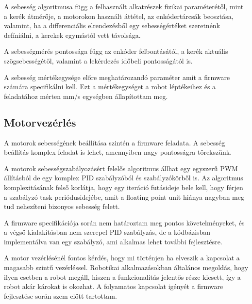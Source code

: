 A sebesség algoritmusa függ a felhasznált alkatrészek fizikai paraméterétől, mint
a kerék átmérője, a motorokon használt áttétel, az enkódertárcsák beosztása,
valamint, ha a differenciális elrendezésből egy sebességértéket szeretnénk
defíniálni, a kerekek egymástól vett távolsága.

A sebességmérés pontossága függ az enkóder felbontásától, a kerék aktuális
szögsebességétől, valamint a lekérdezés időbeli pontosságától is.

A sebesség mértékegysége előre meghatározandó paraméter amit a firmware számára
specifikálni kell. Ezt a mértékegységet a robot léptékeihez és a feladatához
mérten mm/s egységben állapítottam meg.

\subsection{Motorvezérlés}

A motorok sebességének beállítása szintén a firmware feladata. A sebesség
beállítás komplex feladat is lehet, amennyiben nagy pontosságra törekszünk.

A motorok sebességszabályozásért felelős algoritmus állhat egy egyszerű PWM
állításból de egy komplex PID szabályzóból és szabályzókörből is. Az algoritmus
komplexitásának felső korlátja, hogy egy iteráció futásideje bele kell, hogy
férjen a szabályzó task periódusidejébe, amit a floating point unit hiánya
nagyban meg tud nehezíteni bizonyos sebesség felett.

A firmware specifikációja során nem határoztam meg pontos követelményeket, és a
végső kialakításban nem szerepel PID szabályzás, de a kódbázisban implementálva
van egy szabályzó, ami alkalmas lehet további fejlesztésre.

\medskip

A motor vezérlésénél fontos kérdés, hogy mi történjen ha elveszik a kapcsolat a
magasabb szintű vezérléssel. Robotikai alkalmazásokban általános megoldás, hogy
ilyen esetben a robot megáll, hiszen a funkcionalitás jelentős része kiesett, így
a robot akár károkat is okozhat. A folyamatos kapcsolat igényét a firmware
fejlesztése során szem előtt tartottam.

